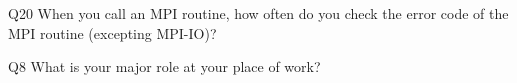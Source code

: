 \begin{description}%
\item{Q20} When you call an MPI routine, how often do you check the error code of the MPI routine  (excepting MPI-IO)?%
\item{Q8} What is your major role at your place of work?%
\end{description}%

